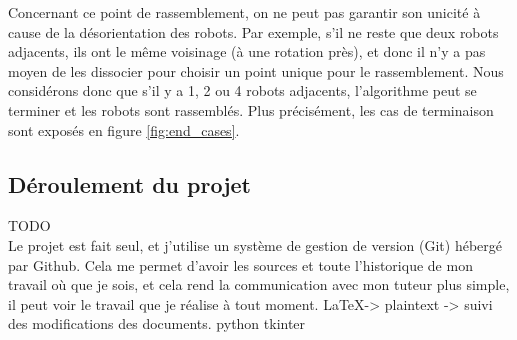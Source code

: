 Concernant ce point de rassemblement, on ne peut pas garantir son unicité à
cause de la désorientation des robots. Par exemple, s'il ne reste que deux
robots adjacents, ils ont le même voisinage (à une rotation près), et donc il
n'y a pas moyen de les dissocier pour choisir un point unique pour le
rassemblement. Nous considérons donc que s'il y a 1, 2 ou 4 robots adjacents,
l'algorithme peut se terminer et les robots sont rassemblés. Plus précisément,
les cas de terminaison sont exposés en figure \ref{fig:end_cases}.




\subsection{Déroulement du projet}
TODO \\
Le projet est fait seul, et j'utilise un système de gestion de version (Git)
hébergé par Github. Cela me permet d'avoir les sources et toute l'historique de
mon travail où que je sois, et cela rend la communication avec mon tuteur plus
simple, il peut voir le travail que je réalise à tout moment.
\LaTeX -> plaintext -> suivi des modifications des documents.
python tkinter \\

